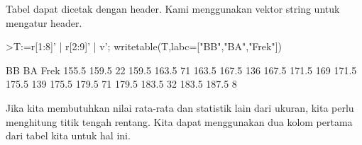 \documentclass[12pt,arial,letterpaper]{book}
\begin{document}
\begin{eulernootebook}
\begin{eulercomment}
\begin{eulercomment}
\begin{eulernootebook}
\begin{eulercomment}
\begin{eulercomment}
\begin{eulercomment}
\begin{eulercomment}
\begin{eulercomment}
\begin{eulercomment}
\begin{eulercomment}
\begin{eulercomment}
Tabel dapat dicetak dengan header. Kami menggunakan vektor string
untuk mengatur header.
\end{eulercomment}
\begin{eulerprompt}
>T:=r[1:8]' | r[2:9]' | v'; writetable(T,labc=["BB","BA","Frek"])
\end{eulerprompt}
\begin{euleroutput}
          BB        BA      Frek
       155.5     159.5        22
       159.5     163.5        71
       163.5     167.5       136
       167.5     171.5       169
       171.5     175.5       139
       175.5     179.5        71
       179.5     183.5        32
       183.5     187.5         8
\end{euleroutput}
\begin{eulercomment}
Jika kita membutuhkan nilai rata-rata dan statistik lain dari ukuran,
kita perlu menghitung titik tengah rentang. Kita dapat menggunakan dua
kolom pertama dari tabel kita untuk hal ini.


\end{eulercomment}
\end{eulercomment}
\end{eulercomment}
\end{eulercomment}
\end{eulercomment}
\end{eulercomment}
\end{eulercomment}
\end{eulercomment}
\end{eulernootebook}
\end{eulercomment}
\end{eulercomment}
\end{eulernootebook}
\end{document}
